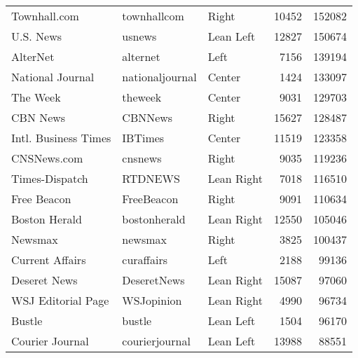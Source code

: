 \begin{tabular}{lllrr}
                             Townhall.com &      townhallcom &         Right &             10452 &     152082 \\
                                U.S. News &           usnews &     Lean Left &             12827 &     150674 \\
                                 AlterNet &         alternet &          Left &              7156 &     139194 \\
                         National Journal &  nationaljournal &        Center &              1424 &     133097 \\
                                 The Week &          theweek &        Center &              9031 &     129703 \\
                                 CBN News &          CBNNews &         Right &             15627 &     128487 \\
                     Intl. Business Times &          IBTimes &        Center &             11519 &     123358 \\
                              CNSNews.com &          cnsnews &         Right &              9035 &     119236 \\
                           Times-Dispatch &          RTDNEWS &    Lean Right &              7018 &     116510 \\
                              Free Beacon &       FreeBeacon &         Right &              9091 &     110634 \\
                            Boston Herald &     bostonherald &    Lean Right &             12550 &     105046 \\
                                  Newsmax &          newsmax &         Right &              3825 &     100437 \\
                          Current Affairs &       curaffairs &          Left &              2188 &      99136 \\
                             Deseret News &      DeseretNews &    Lean Right &             15087 &      97060 \\
                       WSJ Editorial Page &       WSJopinion &    Lean Right &              4990 &      96734 \\
                                   Bustle &           bustle &     Lean Left &              1504 &      96170 \\
                          Courier Journal &   courierjournal &     Lean Left &             13988 &      88551 \\

\end{tabular}

